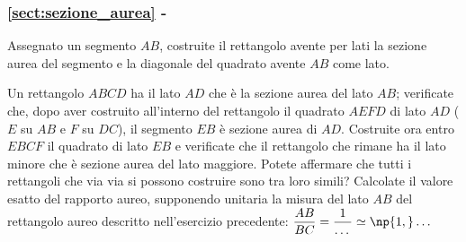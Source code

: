 % 

\begingroup
\hypersetup{linkcolor=black}
\subsubsection*{\ref{sect:sezione_aurea} - 
}
\endgroup

\begin{esercizio}
\label{ese:6.107}
Assegnato un segmento $AB$, costruite il rettangolo avente per lati 
la sezione aurea del segmento e la diagonale del quadrato avente $AB$ 
come lato.
\end{esercizio}

\begin{esercizio}
\label{ese:6.108}
Un rettangolo $ABCD$ ha il lato $AD$ che è la sezione aurea del lato 
$AB$; verificate che, dopo aver costruito all'interno del rettangolo 
il quadrato $AEFD$ di lato $AD$ ($E$ su $AB$ e $F$ su $DC$), il 
segmento $EB$ è sezione aurea di $AD$. Costruite ora entro $EBCF$ il 
quadrato di lato $EB$ e verificate che il rettangolo che rimane ha il 
lato minore che è sezione aurea del lato maggiore. Potete affermare 
che tutti i rettangoli che via via si possono costruire sono tra loro 
simili? Calcolate il valore esatto del rapporto aureo, supponendo 
unitaria la misura del lato $AB$ del rettangolo aureo descritto 
nell'esercizio precedente: $\dfrac{AB}{BC}=\dfrac{1}{\ldots{}}\simeq 
\np{1,}\ldots{}$
\end{esercizio}

